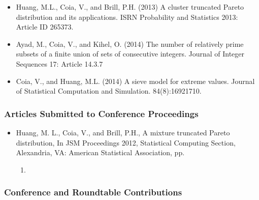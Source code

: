 \documentclass[]{article}
\providecommand{\tightlist}{%
  \setlength{\itemsep}{0pt}\setlength{\parskip}{0pt}}
\begin{document}
\begin{itemize}
\item
  Huang, M.L., Coia, V., and Brill, P.H. (2013) A cluster truncated
  Pareto distribution and its applications. ISRN Probability and
  Statistics 2013: Article ID 265373.
\item
  Ayad, M., Coia, V., and Kihel, O. (2014) The number of relatively
  prime subsets of a finite union of sets of consecutive integers.
  Journal of Integer Sequences 17: Article 14.3.7
\item
  Coia, V., and Huang, M.L. (2014) A sieve model for extreme
  values. Journal of Statistical Computation and Simulation.
  84(8):16921710.
\end{itemize}

\hypertarget{articles-submitted-to-conference-proceedings}{%
\subsubsection{Articles Submitted to Conference Proceedings}\label{articles-submitted-to-conference-proceedings}}

\begin{itemize}
\tightlist
\item
  Huang, M. L., Coia, V., and Brill, P.H., A mixture truncated
  Pareto distribution, In JSM Proceedings 2012, Statistical Computing
  Section, Alexandria, VA: American Statistical Association, pp.

  \begin{enumerate}
  \def\labelenumi{\arabic{enumi}.}
  \setcounter{enumi}{24882497}
  \item
  \end{enumerate}
\end{itemize}

\hypertarget{conference-and-roundtable-contributions}{%
\subsubsection{Conference and Roundtable Contributions}\label{conference-and-roundtable-contributions}}
\end{document}
